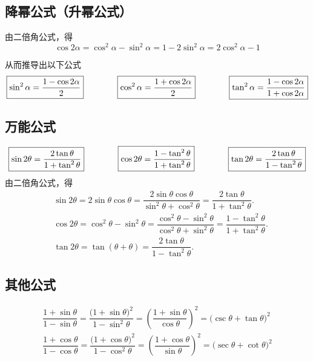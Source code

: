 \subsection{降幂公式（升幂公式）}
由二倍角公式，得
\begin{equation*}
	\cos 2 \alpha = \cos^2 \alpha - \sin^2 \alpha = 1 - 2\sin^2 \alpha = 2 \cos^2 \alpha - 1
\end{equation*}

\noindent 从而推导出以下公式
\begin{equation}
	\boxed{\sin^2 \alpha = \dfrac{1 - \cos 2 \alpha }{2}} \qquad \qquad \boxed{\cos^2 \alpha = \dfrac{1 + \cos 2 \alpha }{2}} \qquad \qquad \boxed{\tan^2 \alpha = \dfrac{1 - \cos 2 \alpha }{1 + \cos 2 \alpha}}
	\vspace*{0.5em}
\end{equation}

\subsection{万能公式}
\begin{equation}
	\boxed{\sin 2 \theta = \dfrac{2 \tan \theta}{1 + \tan^2 \theta}} \qquad \qquad \boxed{\cos 2 \theta = \dfrac{1 - \tan^2 \theta}{1 + \tan^2 \theta}} \qquad \qquad \boxed{\tan 2 \theta = \dfrac{2 \tan \theta}{1 - \tan^2 \theta}}
	\vspace*{0.5em}
\end{equation}
\proof 由二倍角公式，得
\vspace*{-1em}
\begin{align*}
	& \sin 2 \theta = 2 \sin \theta \cos \theta = \dfrac{2 \sin \theta \cos \theta }{\sin^2 \theta + \cos^2 \theta} = \dfrac{2 \tan \theta}{1 + \tan^2 \theta}. \\[0.5em]
	&\cos 2 \theta = \cos^2 \theta - \sin^2 \theta = \dfrac{\cos^2 \theta - \sin^2 \theta}{\cos^2 \theta + \sin^2 \theta} = \dfrac{1 - \tan^2 \theta}{1 + \tan^2 \theta}.\\[0.5em]
	&\tan 2 \theta = \tan (\theta + \theta) = \dfrac{2 \tan\theta}{1 - \tan^2 \theta}.
\end{align*}


\subsection{其他公式}
\vspace*{-1em}
\begin{align}
	\dfrac{1 + \sin \theta}{1 - \sin \theta} = \dfrac{\big(1 + \sin \theta \big)^2}{1 - \sin^2 \theta} = \left( \dfrac{1 + \sin \theta}{\cos \theta} \right)^2 = \big(\csc \theta + \tan \theta \big)^2 \\[0.5em]
	\dfrac{1 + \cos \theta}{1 - \cos \theta} = \dfrac{\big( 1 + \cos \theta \big)^2}{1 - \cos^2 \theta} = \left( \dfrac{1 + \cos \theta}{\sin \theta} \right)^2 = \big( \sec \theta + \cot \theta \big)^2
\end{align}

